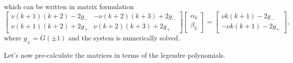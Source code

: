 \documentclass[12pt]{article}
\theoremstyle{definition}
\begin{document}

which can be written in matrix formulation
\[
\begin{bmatrix}
    \nu (k+1)(k+2) - 2g_{-} & -\nu (k+2)(k+3) + 2g_- \\
    \nu (k+1)(k+2) + 2g_+ & \nu (k+2)(k+3) + 2g_+
\end{bmatrix}\begin{bmatrix}
    \alpha_k \\ \beta_k
\end{bmatrix} = \begin{bmatrix}
    \nu k(k+1) - 2g_- \\ -\nu k(k+1) - 2g_+
\end{bmatrix},
\]
where $g_{\pm} = \dot{G}(\pm 1)$ and the system is numerically solved.

Let's now pre-calculate the matrices in terms of the legendre polynomials.
\end{document}
